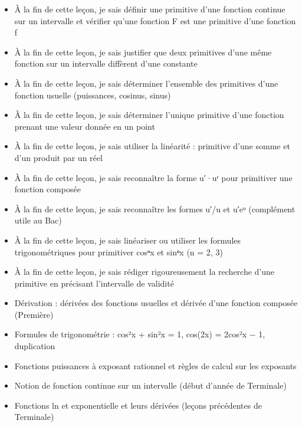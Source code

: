 \documentclass[11pt]{article}
\begin{document}
\begin{objectifs}
\begin{itemize}
\item À la fin de cette leçon, je sais définir une primitive d'une fonction continue sur un intervalle et vérifier qu'une fonction F est une primitive d'une fonction f
\item À la fin de cette leçon, je sais justifier que deux primitives d'une même fonction sur un intervalle diffèrent d'une constante
\item À la fin de cette leçon, je sais déterminer l'ensemble des primitives d'une fonction usuelle (puissances, cosinus, sinus)
\item À la fin de cette leçon, je sais déterminer l'unique primitive d'une fonction prenant une valeur donnée en un point
\item À la fin de cette leçon, je sais utiliser la linéarité : primitive d'une somme et d'un produit par un réel
\item À la fin de cette leçon, je sais reconnaître la forme u′·uʳ pour primitiver une fonction composée
\item À la fin de cette leçon, je sais reconnaître les formes u′/u et u′eᵘ (complément utile au Bac)
\item À la fin de cette leçon, je sais linéariser ou utiliser les formules trigonométriques pour primitiver cosⁿx et sinⁿx (n = 2, 3)
\item À la fin de cette leçon, je sais rédiger rigoureusement la recherche d'une primitive en précisant l'intervalle de validité
\end{itemize}
\end{objectifs}

\begin{prerequis}
\begin{itemize}
\item Dérivation : dérivées des fonctions usuelles et dérivée d'une fonction composée (Première)
\item Formules de trigonométrie : cos²x + sin²x = 1, cos(2x) = 2cos²x − 1, duplication
\item Fonctions puissances à exposant rationnel et règles de calcul sur les exposants
\item Notion de fonction continue sur un intervalle (début d'année de Terminale)
\item Fonctions ln et exponentielle et leurs dérivées (leçons précédentes de Terminale)
\end{itemize}
\end{prerequis}
\end{document}
